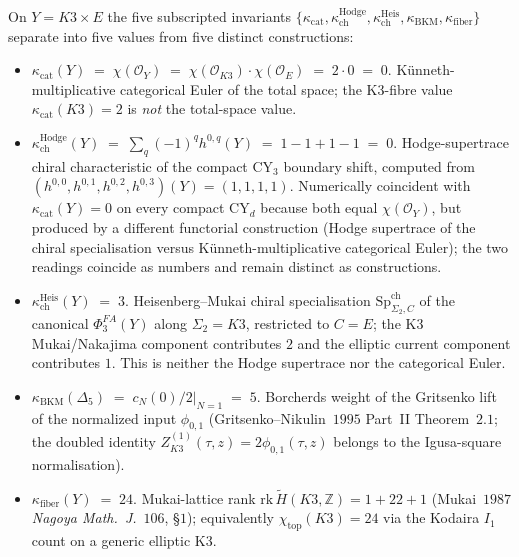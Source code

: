 \begin{theorem}
\label{thm:k3-chiral-bialgebra-four-kappas}
On $Y = K3 \times E$ the five subscripted invariants $\{\kappa_{\mathrm{cat}}, \kappa_{\mathrm{ch}}^{\mathrm{Hodge}}, \kappa_{\mathrm{ch}}^{\mathrm{Heis}}, \kappa_{\mathrm{BKM}}, \kappa_{\mathrm{fiber}}\}$ separate into five values from five distinct constructions:
\begin{itemize}
\item $\kappa_{\mathrm{cat}}(Y) \;=\; \chi(\mathcal{O}_Y) \;=\; \chi(\mathcal{O}_{K3}) \cdot \chi(\mathcal{O}_E) \;=\; 2 \cdot 0 \;=\; 0$. K\"unneth-multiplicative categorical Euler of the total space; the K3-fibre value $\kappa_{\mathrm{cat}}(K3) = 2$ is \emph{not} the total-space value.
\item $\kappa_{\mathrm{ch}}^{\mathrm{Hodge}}(Y) \;=\; \sum_q (-1)^q h^{0, q}(Y) \;=\; 1 - 1 + 1 - 1 \;=\; 0$. Hodge-supertrace chiral characteristic of the compact CY$_3$ boundary shift, computed from $(h^{0, 0}, h^{0, 1}, h^{0, 2}, h^{0, 3})(Y) = (1, 1, 1, 1)$. Numerically coincident with $\kappa_{\mathrm{cat}}(Y) = 0$ on every compact CY$_d$ because both equal $\chi(\mathcal{O}_Y)$, but produced by a different functorial construction (Hodge supertrace of the chiral specialisation versus K\"unneth-multiplicative categorical Euler); the two readings coincide as numbers and remain distinct as constructions.
\item $\kappa_{\mathrm{ch}}^{\mathrm{Heis}}(Y) \;=\; 3$. Heisenberg--Mukai chiral specialisation $\mathrm{Sp}^{\mathrm{ch}}_{\Sigma_2, C}$ of the canonical $\Phi^{FA}_3(Y)$ along $\Sigma_2 = K3$, restricted to $C = E$; the K3 Mukai/Nakajima component contributes $2$ and the elliptic current component contributes $1$. This is neither the Hodge supertrace nor the categorical Euler.
\item $\kappa_{\mathrm{BKM}}(\Delta_5) \;=\; c_N(0)/2|_{N=1} \;=\; 5$. Borcherds weight of the Gritsenko lift of the normalized input $\phi_{0, 1}$ (Gritsenko--Nikulin~$1995$ Part~II Theorem~$2.1$; the doubled identity \(Z^{(1)}_{K3}(\tau,z)=2\phi_{0,1}(\tau,z)\) belongs to the Igusa-square normalisation).
\item $\kappa_{\mathrm{fiber}}(Y) \;=\; 24$. Mukai-lattice rank $\mathrm{rk}\,\widetilde H(K3, \mathbb{Z}) = 1 + 22 + 1$ (Mukai~$1987$ \emph{Nagoya Math.\ J.}~$106$, \S$1$); equivalently $\chi_{\mathrm{top}}(K3) = 24$ via the Kodaira $I_1$ count on a generic elliptic K3.
\end{itemize}

\end{theorem}

